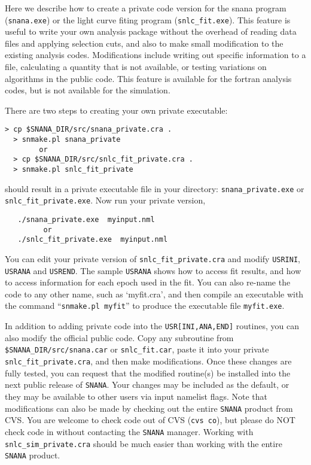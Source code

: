 \documentclass[12pt]{article}
\begin{document}
Here we describe how to create a private code version for
the snana program ({\tt snana.exe}) or the light curve fiting
program ({\tt snlc\_fit.exe}). This feature is useful to write your
own analysis package without the overhead of 
reading data files and applying selection cuts,
and also to make small modification to the existing analysis codes.
Modifications include writing out specific information to a file, 
calculating a quantity that is not available,
or testing variations on algorithms in the public code.
This feature is available for the fortran analysis codes,
but is not available for the simulation.

There are two steps to creating your own private executable:
%
\begin{Verbatim}[frame=single]
  > cp $SNANA_DIR/src/snana_private.cra .
  > snmake.pl snana_private
        or
  > cp $SNANA_DIR/src/snlc_fit_private.cra .
  > snmake.pl snlc_fit_private
\end{Verbatim}
%
should result in a private executable file in your directory:
{\tt snana\_private.exe} or {\tt snlc\_fit\_private.exe}.
Now run your private version, 
%
\begin{verbatim}
   ./snana_private.exe  myinput.nml
         or
   ./snlc_fit_private.exe  myinput.nml
\end{verbatim}
%
You can edit your private version of {\tt snlc\_fit\_private.cra}
and modify {\tt USRINI}, {\tt USRANA} and {\tt USREND}.
The sample {\tt USRANA} shows how to access fit results,
and how to access information for each epoch used in
the fit.
You can also re-name the code to any other name, 
such as `myfit.cra', and then compile an executable
with the command ``{\tt snmake.pl myfit}'' to produce
the executable file {\tt myfit.exe}.


In addition to adding private code into the {\tt USR[INI,ANA,END]}
routines, you can also modify the official public code. 
Copy any subroutine from {\tt \$SNANA\_DIR/src/snana.car} or 
{\tt snlc\_fit.car},
paste it into your private {\tt snlc\_fit\_private.cra},
and then make modifications. Once these changes are fully tested,
you can request that the modified routine(s) be installed into
the next public release of {\tt SNANA}. Your changes may be
included as the default, or they may be available to other 
users via input namelist flags.
Note that modifications can also be made by checking out
the entire {\tt SNANA} product from CVS.
You are welcome to check code out of CVS ({\tt cvs co}),
but please do NOT check code in without contacting
the {\tt SNANA} manager.  Working with {\tt snlc\_sim\_private.cra}
should be much easier than working with the entire {\tt SNANA} product.
\end{document}
